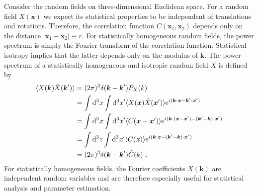 \documentclass[12pt,a4paper]{article}
\renewcommand{\vec}[1]{\boldsymbol{#1}}
\newcommand{\dif}{\mathrm{d}}
\begin{document}
Consider the random fields on three-dimensional Euclidean space. For a random field $X(\vec{x})$ we expect its statistical properties to be independent of translations and rotations. Therefore, the correlation function $C(\vec{x}_1, \vec{x}_2)$ depends only on the distance $|\vec{x}_1 - \vec{x}_2| \equiv r$. For statistically homogeneous random fields, the power spectrum is simply the Fourier transform of the correlation function. Statistical isotropy implies that the latter depends only on the modulus of $\vec{k}$. The power spectrum of a statistically homogeneous and isotropic random field $X$ is defined by
\begin{align}
\nonumber \langle X(\vec{k}) \bar{X}(\vec{k}^\prime) \rangle &= (2\pi)^3 \delta(\vec{k} -\vec{k}^\prime) P_X(k) \\
\nonumber &= \int \dif^3 x \int \dif^3 x^\prime \langle X(\vec{x}) \bar{X}(\vec{x}^\prime) \rangle {\rm e}^{i(\vec{k}\cdot \vec{x} -\vec{k}^\prime \cdot \vec{x}^\prime)} \\
\nonumber &= \int \dif^3 x \int \dif^3 x^\prime \langle C(\vec{x} -\vec{x}^\prime) \rangle {\rm e}^{i(\vec{k}\cdot (\vec{x}-\vec{x}^\prime) -(\vec{k}^\prime -\vec{k}) \cdot \vec{x}^\prime)} \\
\nonumber &=  \int \dif^3 z \int \dif^3 x^\prime \langle C(\vec{z}) \rangle {\rm e}^{i(\vec{k}\cdot \vec{z} -(\vec{k}^\prime -\vec{k}) \cdot \vec{x}^\prime)} \\
&= (2\pi)^3 \delta(\vec{k}-\vec{k}^\prime) \hat{C}(k) ~.
\end{align}
For statistically homogeneous fields, the Fourier coefficients $X(\vec{k})$ are independent random variables and are therefore especially useful for statistical analysis and parameter estimation.




































\end{document}
